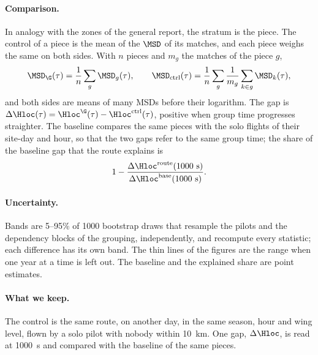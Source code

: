 \paragraph{Comparison.} In analogy with the zones of the general report, the stratum is the piece.
The control of a piece is the mean of the $\MSD$ of its matches, and each piece weighs the same on
both sides. With $n$ pieces and $m_g$ the matches of the piece $g$,
\begin{equation}\label{eq:reweight}
  \MSD_{\G}(\tau)=\frac1n\sum_{g}\MSD_g(\tau),\qquad
  \MSD_{\mathrm{ctrl}}(\tau)=\frac1n\sum_{g}\frac1{m_g}\sum_{k\in g}\MSD_k(\tau),
\end{equation}
and both sides are means of many MSDs before their logarithm. The gap is
$\Delta\Hloc(\tau)=\Hloc^{\G}(\tau)-\Hloc^{\mathrm{ctrl}}(\tau)$, positive when group time progresses
straighter. The baseline compares the same pieces with the solo flights of their site-day and hour, so
that the two gaps refer to the same group time; the share of the baseline gap that the route explains is
\begin{equation}\label{eq:explained}
  1-\frac{\Delta\Hloc^{\mathrm{route}}(1000~\mathrm{s})}{\Delta\Hloc^{\mathrm{base}}(1000~\mathrm{s})}.
\end{equation}

\paragraph{Uncertainty.} Bands are 5--95\% of 1000 bootstrap draws that resample the pilots and
the dependency blocks of the grouping, independently, and recompute every statistic; each difference has
its own band. The thin lines of the figures are the range when one year at a time is left out. The
baseline and the explained share are point estimates.

\paragraph{What we keep.} The control is the same route, on another day, in the same season, hour and
wing level, flown by a solo pilot with nobody within 10~km. One gap, $\Delta\Hloc$, is read at
1000~s and compared with the baseline of the same pieces.
